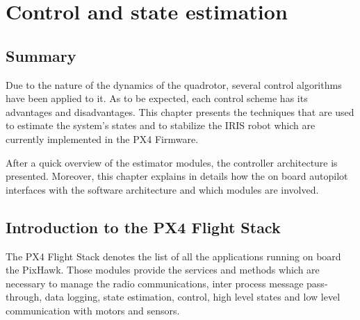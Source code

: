 
\chapter{Control and state estimation}
\label{chap:fifth}
\ifpdf
    \graphicspath{{Chapter5/Figures/PNG/}{Chapter5/Figures/PDF/}{Chapter5/Figures/}}
\else
    \graphicspath{{Chapter5/Figures/EPS/}{Chapter5/Figures/}}
\fi

\section*{Summary}
Due to the nature of the dynamics of the quadrotor, several control algorithms have been applied to it. As to be expected, each control scheme has its advantages and disadvantages. This chapter presents the techniques that are used to estimate the system's states and to stabilize the IRIS robot which are currently implemented in the PX4 Firmware.\par After a quick overview of the estimator modules, the controller architecture is presented. Moreover, this chapter explains in details how the on board autopilot interfaces with the software architecture and which modules are involved.

\section{Introduction to the PX4 Flight Stack}

The PX4 Flight Stack denotes the list of all the applications running on board the PixHawk. Those modules provide the services and methods which are necessary to manage the radio communications, inter process message pass-through, data logging, state estimation, control, high level states and low level communication with motors and sensors.

